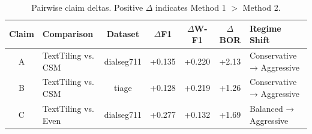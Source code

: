 \begin{table}[t]
\centering
\small
\begin{tabular}{clcccc}
\toprule
Claim & Comparison & Dataset & $\Delta$F1 & $\Delta$W-F1 & $\Delta$BOR & Regime Shift \\
\midrule
A & TextTiling vs. CSM & dialseg711 & +0.135 & +0.220 & +2.13 & Conservative → Aggressive \\
B & TextTiling vs. CSM & tiage & +0.128 & +0.219 & +1.26 & Conservative → Aggressive \\
C & TextTiling vs. Even & dialseg711 & +0.277 & +0.132 & +1.69 & Balanced → Aggressive \\
\bottomrule
\end{tabular}
\caption{Pairwise claim deltas. Positive $\Delta$ indicates Method 1 $>$ Method 2.}
\label{tab:leaderboard-deltas}
\end{table}
